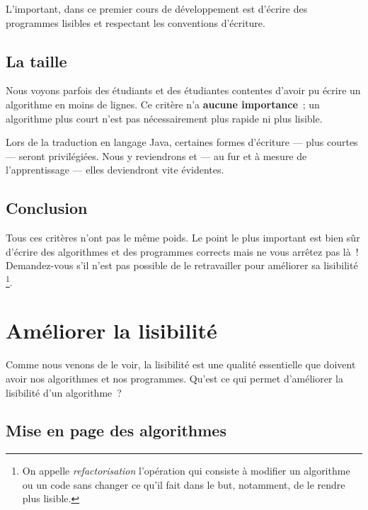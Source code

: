			L'important, dans ce premier cours de développement est d'écrire des 
			programmes lisibles et  respectant les conventions d'écriture. 
			
		\subsection{La taille}
		
			Nous voyons parfois des étudiants et des étudiantes contentes
			d’avoir pu écrire un algorithme en moins de lignes.  Ce critère n’a
			\textbf{aucune importance}~; un algorithme plus court n’est pas
			nécessairement plus rapide ni plus lisible.

			Lors de la traduction en langage Java, certaines formes d'écriture
			— plus courtes — seront privilégiées. Nous y reviendrons et — au fur
			et à mesure de l'apprentissage — elles deviendront vite évidentes.
		
		\subsection{Conclusion}
			
			Tous ces critères n’ont pas le même poids.  Le point le plus
			important est bien sûr d’écrire des algorithmes et des programmes
			corrects mais ne vous arrêtez pas là~!  Demandez-vous s’il n’est pas
			possible de le retravailler pour améliorer sa lisibilité%
			\footnote{%
				On appelle \emph{refactorisation} l’opération qui consiste
				à modifier un algorithme ou un code sans changer ce qu’il fait
				dans le but, notamment, de le rendre plus lisible.
			}.
		
	\section{Améliorer la lisibilité}
	\label{lisibilite}
		
		Comme nous venons de le voir, la lisibilité est une qualité essentielle
		que doivent avoir nos algorithmes et nos programmes.  Qu’est ce qui
		permet d’améliorer la lisibilité d’un algorithme~?

		\subsection{Mise en page des algorithmes}
		
